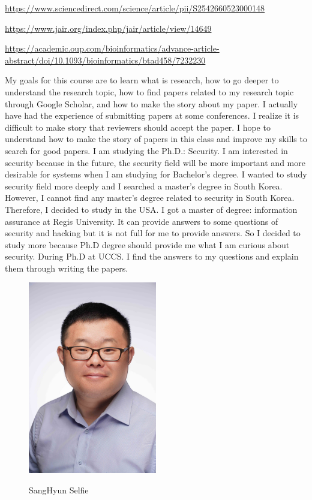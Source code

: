 \url{https://www.sciencedirect.com/science/article/pii/S2542660523000148}


\url{https://www.jair.org/index.php/jair/article/view/14649}


\url{https://academic.oup.com/bioinformatics/advance-article-abstract/doi/10.1093/bioinformatics/btad458/7232230}


My goals for this course are to learn what is research, how to go deeper to understand the research topic, how to find papers related to my research topic through Google Scholar, and how to make the story about my paper. I actually have had the experience of submitting papers at some conferences. I realize it is difficult to make story that reviewers should accept the paper. I hope to understand how to make the story of papers in this class and improve my skills to search for good papers. I am studying the Ph.D.: Security. I am interested in security because in the future, the security field will be more important and more desirable for systems when I am studying for Bachelor’s degree. I wanted to study security field more deeply and I searched a master's degree in South Korea. However, I cannot find any master's degree related to security in South Korea. Therefore, I decided to study in the USA. I got a master of degree: information assurance at Regis University. It can provide answers to some questions of security and hacking but it is not full for me to provide answers. So I decided to study more because Ph.D degree should provide me what I am curious about security. During Ph.D at UCCS. I find the answers to my questions and explain them through writing the papers. 
\begin{figure}[t]
\centering
{\includegraphics [width=0.5\textwidth]{sang}}
\caption{SangHyun Selfie 
}
\label{fig:SPSC}
\end{figure}



